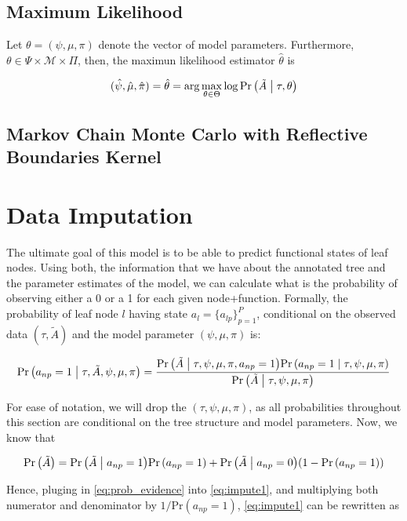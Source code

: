 \documentclass[12pt]{article}
\renewcommand{\Pr}[1]{{\mbox{Pr}\left(#1\right) }}
\newcommand{\Prcond}[2]{{\mbox{Pr}\left(#1\;\vphantom{#2}\right|\left.\vphantom{#1}#2\right) }}
\begin{document}
\subsection{Maximum Likelihood}

Let $\theta = (\psi, \mu, \pi)$ denote the vector of model parameters. Furthermore, $\theta \in \Psi\times \mathcal{M} \times \Pi$, then, the maximun likelihood estimator $\hat \theta$ is

$$
(\hat \psi, \hat \mu, \hat \pi) = \hat\theta = \arg \max_{\theta \in \Theta} \log \Prcond{\tilde A}{\tau, \theta}
$$


\subsection{Markov Chain Monte Carlo with Reflective Boundaries Kernel}

\section{Data Imputation}

The ultimate goal of this model is to be able to predict functional states of leaf nodes. Using both, the information that we have about the annotated tree and the parameter estimates of the model, we can calculate what is the probability of observing either a 0 or a 1 for each given node+function. Formally, the probability of leaf node $l$ having state $a_l = \{a_{lp}\}_{p=1}^P$, conditional on the observed data $(\tau, \tilde A)$ and the model parameter $(\psi, \mu, \pi)$ is:

\begin{equation}
\label{eq:impute1}
\Prcond{a_{np} = 1}{\tau, \tilde A, \psi, \mu, \pi} = \frac{\Prcond{\tilde A}{\tau, \psi, \mu, \pi, a_{np} = 1} \Prcond{a_{np}=1}{\tau, \psi, \mu, \pi}}{
\Prcond{\tilde A}{\tau, \psi, \mu, \pi}
}
\end{equation}

For ease of notation, we will drop the $(\tau, \psi, \mu, \pi)$, as all probabilities throughout this section are conditional on the tree structure and model parameters. Now, we know that

\begin{equation}
\label{eq:prob_evidence}
\Pr{\tilde A} = \Prcond{\tilde A}{a_{np} = 1} \Pr{a_{np} = 1} + \Prcond{\tilde A}{a_{np} = 0} (1 - \Pr{a_{np} = 1})
\end{equation}

Hence, pluging in \eqref{eq:prob_evidence} into \eqref{eq:impute1}, and multiplying both numerator and denominator by $1/\Pr{a_{np} = 1}$, \eqref{eq:impute1} can be rewritten as
\end{document}
